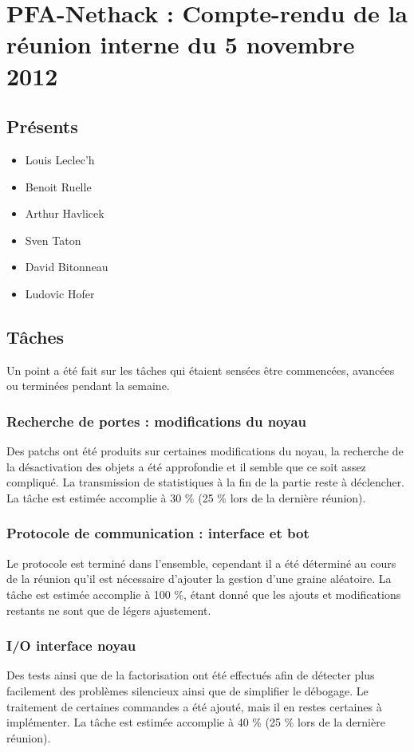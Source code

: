 \documentclass{article}
\newcommand {\ST}{Sven Taton}
\newcommand {\LL}{Louis Leclec'h}
\newcommand {\DB}{David Bitonneau}
\newcommand {\AH}{Arthur Havlicek}
\newcommand {\BR}{Benoit Ruelle}
\newcommand {\LH}{Ludovic Hofer}
\begin{document}
\section*{PFA-Nethack : Compte-rendu de la réunion interne du 5 novembre 2012}

\subsection*{Présents}
\begin{itemize}
\item \LL
\item \BR
\item \AH
\item \ST
\item \DB
\item \LH
\end{itemize}

\subsection*{Tâches}
Un point a été fait sur les tâches qui étaient sensées être commencées,
avancées ou terminées pendant la semaine.

\subsubsection*{Recherche de portes : modifications du noyau}
Des patchs ont été produits sur certaines modifications du noyau, la
recherche de la désactivation des objets a été approfondie et il semble que
ce soit assez compliqué. La transmission de statistiques à la fin de la
partie reste à déclencher. La tâche est estimée accomplie à 30 \% (25 \%
lors de la dernière réunion).

\subsubsection*{Protocole de communication : interface et bot}
Le protocole est terminé dans l'ensemble, cependant il a été déterminé au
cours de la réunion qu'il est nécessaire d'ajouter la gestion d'une graine
aléatoire. La tâche est estimée accomplie à 100 \%, étant donné que les
ajouts et modifications restants ne sont que de légers ajustement.

\subsubsection*{I/O interface noyau}
Des tests ainsi que de la factorisation ont été effectués afin de détecter
plus facilement des problèmes silencieux ainsi que de simplifier le débogage.
Le traitement de certaines commandes a été ajouté, mais il en restes
certaines à implémenter. La tâche est estimée accomplie à 40 \% (25 \% lors
de la dernière réunion).
\end{document}
